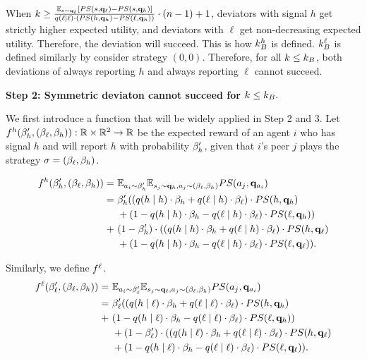When $k \ge \frac{\mathbb{E}_{s\sim \mathbf{q}_{\ell}}[PS(s, \mathbf{q}_{\ell}) - PS(s, \mathbf{q}_{h})]}{ q(\ell \mid \ell) \cdot (PS(h, \mathbf{q}_h) - PS(\ell, \mathbf{q}_h))}\cdot (n-1) + 1$, deviators with signal $h$ get strictly higher expected utility, and deviators with $\ell$ get non-decreasing expected utility. Therefore, the deviation will succeed. 
This is how $k_B^h$ is defined.
$k_B^\ell$ is defined similarly by consider strategy $(0, 0)$. 
Therefore, for all $k \le k_B$, both deviations of always reporting $h$ and always reporting $\ell$ cannot succeed.

\noindent\textbf{Step 2: Symmetric deviaton cannot succeed for $k \le k_B.$}

We first introduce a function that will be widely applied in Step 2 and 3. Let $f^h(\beta_{h}', (\beta_{\ell}, \beta_{h})): \mathbb{R} \times \mathbb{R}^2 \to \mathbb{R}$ be the expected reward of an agent $i$ who has signal $h$ and will report $h$ with probability $\beta_{h}'$, given that $i$'s peer $j$ plays the strategy $\sigma = (\beta_{\ell}, \beta_{h})$. 

\begin{align*}
    f^h(\beta_{h}', (\beta_{\ell}, \beta_{h})) = &\ \mathbb{E}_{a_i \sim \beta_{h}'} \mathbb{E}_{s_j \sim \mathbf{q}_{h}, a_j \sim (\beta_{\ell},\beta_{h})} PS(a_j, \mathbf{q}_{a_i})\\
    =&\ \beta_{h}'((q(h\mid h)\cdot \beta_{h} + q(\ell\mid h)\cdot \beta_\ell)\cdot PS(h, \mathbf{q}_h)\\
    &\ + (1 -  q(h\mid h)\cdot \beta_{h} - q(\ell\mid h)\cdot \beta_\ell)\cdot PS(\ell,\mathbf{q}_h))\\
     + &\ (1 - \beta_{h}')\cdot ((q(h\mid h)\cdot \beta_{h} + q(\ell\mid h)\cdot \beta_\ell)\cdot PS(h, \mathbf{q}_\ell)\\
    &\ + (1 -  q(h\mid h)\cdot \beta_{h} - q(\ell\mid h)\cdot \beta_\ell)\cdot PS(\ell,\mathbf{q}_\ell)). 
\end{align*}

Similarly, we define $f^{\ell}$. 
\begin{align*}
    f^\ell(\beta_{\ell}', (\beta_{\ell}, \beta_{h})) = &\ \mathbb{E}_{a_i \sim \beta_{\ell}'} \mathbb{E}_{s_j \sim \mathbf{q}_{\ell}, a_j \sim (\beta_{\ell},\beta_{h})} PS(a_j, \mathbf{q}_{a_i})\\
    =&\ \beta_{\ell}'((q(h\mid \ell)\cdot \beta_{h} + q(\ell\mid \ell)\cdot \beta_\ell)\cdot PS(h, \mathbf{q}_h)\\
     + &\ (1 -  q(h\mid \ell)\cdot \beta_{h} - q(\ell\mid \ell)\cdot \beta_\ell)\cdot PS(\ell,\mathbf{q}_h))\\
    &\ + (1 - \beta_{\ell}')\cdot ((q(h\mid \ell)\cdot \beta_{h} + q(\ell\mid \ell)\cdot \beta_\ell)\cdot PS(h, \mathbf{q}_\ell)\\
    &\ + (1 -  q(h\mid \ell)\cdot \beta_{h} - q(\ell\mid \ell)\cdot \beta_\ell)\cdot PS(\ell,\mathbf{q}_\ell)). 
\end{align*}

